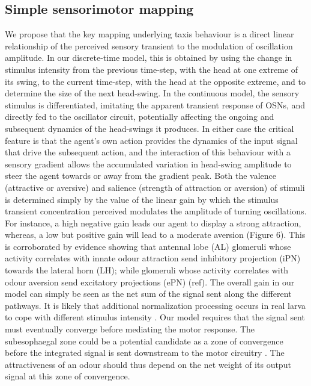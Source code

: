\documentclass[10pt,a4paper]{article}
\begin{document}
\subsection{Simple sensorimotor mapping}
We propose that the key mapping underlying taxis behaviour is a direct linear relationship of the perceived sensory transient to the modulation of oscillation amplitude. In our discrete-time model, this is obtained by using the change in stimulus intensity from the previous time-step, with the head at one extreme of its swing, to the current time-step, with the head at the opposite extreme, and to determine the size of the next head-swing.  In the continuous model, the sensory stimulus is differentiated, imitating the apparent transient response of OSNs, and directly fed to the oscillator circuit, potentially affecting the ongoing and subsequent dynamics of the head-swings it produces. In either case the critical feature is that the agent’s own action provides the dynamics of the input signal that drive the subsequent action, and the interaction of this behaviour with a sensory gradient allows the accumulated variation in head-swing amplitude to steer the agent towards or away from the gradient peak. 
Both the valence (attractive or aversive) and salience (strength of attraction or aversion) of stimuli is determined simply by the value of the linear gain by which the stimulus transient concentration perceived modulates the amplitude of turning oscillations. For instance, a high negative gain leads our agent to display a strong attraction, whereas, a low but positive gain will lead to a moderate aversion (Figure 6). This is corroborated by evidence showing that antennal lobe (AL) glomeruli whose activity correlates with innate odour attraction send inhibitory projection (iPN) towards the lateral horn (LH); while glomeruli whose activity correlates with odour aversion send excitatory projections (ePN) (ref). The overall gain in our model can simply be seen as the net sum of the signal sent along the different pathways. It is likely that additional normalization processing occurs in real larva to cope with different stimulus intensity \cite[see for example odd neurons in][]{slater2015central}.
Our model requires that the signal sent must eventually converge before mediating the motor response. The subesophaegal zone could be a potential candidate as a zone of convergence before the integrated signal is sent downstream to the motor circuitry \cite{tastekin2015role}. The attractiveness of an odour should thus depend on the net weight of its output signal at this zone of convergence.   
  
\end{document}
